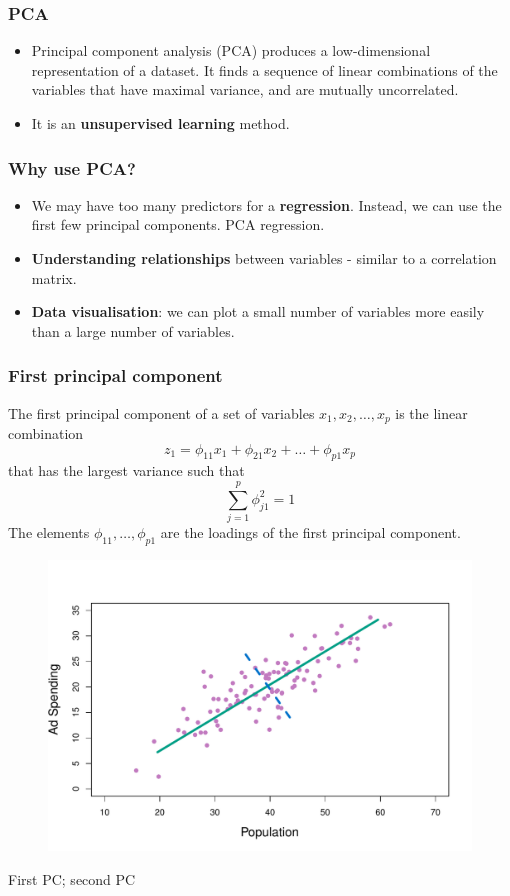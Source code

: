 \documentclass[a4paper]{article}\usepackage[]{graphicx}\usepackage[]{xcolor}
\begin{document}
\subsubsection{PCA}
\begin{itemize}
	\item Principal component analysis (PCA) produces a low-dimensional representation of a dataset. It finds a sequence of linear combinations of the variables that have \textcolor{myred}{maximal variance}, and are \textcolor{myred}{mutually uncorrelated}.
	\item It is an \textcolor{myblue}{\textbf{unsupervised learning}} method.
\end{itemize}
\subsubsection{Why use PCA?}
\begin{itemize}
	\item We may have too many predictors for a \textcolor{myred}{\textbf{regression}}. Instead, we can use the first few principal components. \textcolor{myred}{PCA regression}.
	\item \textcolor{myred}{\textbf{Understanding relationships}} between variables - similar to a correlation matrix.
	\item \textcolor{myred}{\textbf{Data visualisation}}: we can plot a small number of variables more easily than a large number of variables.
\end{itemize}

\subsubsection{First principal component}

The first principal component of a set of variables \( x_1, x_2, \dots, x_p \) is the linear combination
\[
	z_1 = \phi_{11}x_1 + \phi_{21} x_2 + \dots + \phi_{p1} x_p
\]
that has the largest variance such that  
\[
	\sum_{j=1}^p \phi^2_{j1} = 1
\]
The elements \( \phi_{11},\dotsc,\phi_{p1} \) are the \textcolor{myred}{loadings} of the first principal component.
\begin{figure}[H]
	\centering
	\includegraphics[scale=0.5]{6_14}
\end{figure}
\textcolor{mygreen}{First PC}; \textcolor{myblue}{second PC}
\end{document}
